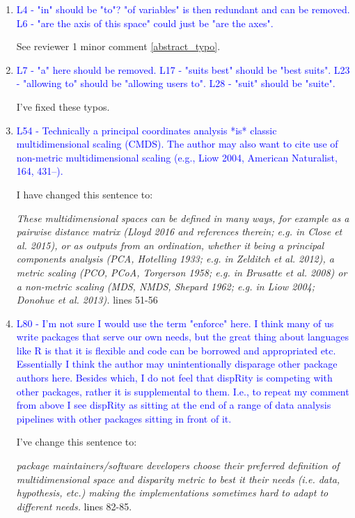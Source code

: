 \documentclass[12pt,letterpaper]{article}
\begin{document}
\begin{enumerate}

\item{\textcolor{blue}{L4 - "in" should be "to"? "of variables" is then redundant and can be removed. L6 - "are the axis of this space" could just be "are the axes".}}

See reviewer 1 minor comment \ref{abstract_typo}.

\item{\textcolor{blue}{L7 - "a" here should be removed. L17 - "suits best" should be "best suits". L23 - "allowing to" should be "allowing users to". L28 - "suit" should be "suite".}}

I've fixed these typos.

\item{\textcolor{blue}{L54 - Technically a principal coordinates analysis *is* classic multidimensional scaling (CMDS). The author may also want to cite use of non-metric multidimensional scaling (e.g., Liow 2004, American Naturalist, 164, 431–).}}
\label{PCO_cites}

I have changed this sentence to:

\textit{These multidimensional spaces can be defined in many ways, for example as a pairwise distance matrix (Lloyd 2016 and references therein; e.g. in Close et al. 2015), or as outputs from an ordination, whether it being a principal components analysis (PCA, Hotelling 1933; e.g. in Zelditch et al. 2012), a metric scaling (PCO, PCoA, Torgerson 1958; e.g. in Brusatte et al. 2008) or a non-metric scaling (MDS, NMDS, Shepard 1962; e.g. in Liow 2004; Donohue et al. 2013).} lines 51-56


\item{\textcolor{blue}{L80 - I'm not sure I would use the term "enforce" here. I think many of us write packages that serve our own needs, but the great thing about languages like R is that it is flexible and code can be borrowed and appropriated etc. Essentially I think the author may unintentionally disparage other package authors here. Besides which, I do not feel that dispRity is competing with other packages, rather it is supplemental to them. I.e., to repeat my comment from above I see dispRity as sitting at the end of a range of data analysis pipelines with other packages sitting in front of it.}}

I've change this sentence to:

\textit{package maintainers/software developers choose their preferred definition of multidimensional space and disparity metric to best it their needs (i.e. data, hypothesis, etc.) making the implementations sometimes hard to adapt to different needs.} lines 82-85.


\end{enumerate}
\end{document}
